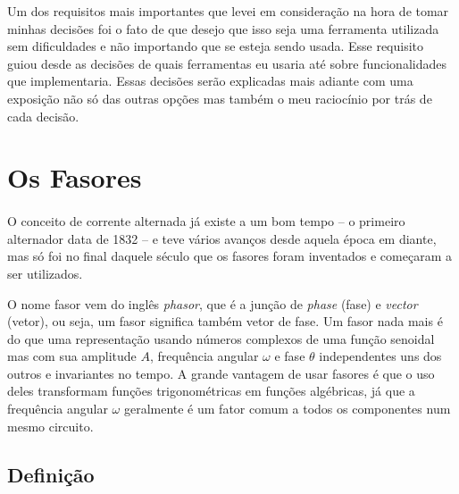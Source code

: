 \documentclass[conference,harvard, brazil]{sbatex}
\begin{document}
	Um dos requisitos mais importantes que levei em consideração na hora de tomar minhas decisões foi o fato de que desejo que isso seja uma ferramenta utilizada sem dificuldades e não importando que se esteja sendo usada. Esse requisito guiou desde as decisões de quais ferramentas eu usaria até sobre funcionalidades que implementaria. Essas decisões serão explicadas mais adiante com uma exposição não só das outras opções mas também o meu raciocínio por trás de cada decisão.
	
	\section{Os Fasores}
	\paragraph{}O conceito de corrente alternada já existe a um bom tempo -- o primeiro alternador data de 1832 -- e teve vários avanços desde aquela época em diante, mas só foi no final daquele século que os fasores foram inventados e começaram a ser utilizados.
	
	O nome fasor vem do inglês {\em phasor}, que é a junção de {\em phase} (fase) e {\em vector} (vetor), ou seja, um fasor significa também vetor de fase. Um fasor nada mais é do que uma representação usando números complexos de uma função senoidal mas com sua amplitude $A$, frequência angular $\omega$ e fase $\theta$  independentes uns dos outros e invariantes no tempo. A grande vantagem de usar fasores é que o uso deles transformam funções trigonométricas em funções algébricas, já que a frequência angular $\omega$ geralmente é um fator comum a todos os componentes num mesmo circuito.
	\subsection{Definição}
	\label{sec:def}
\end{document}
